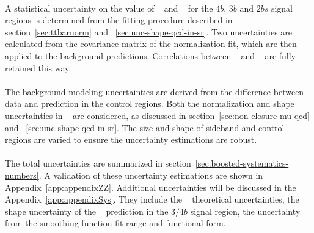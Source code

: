 \paragraph{}
A statistical uncertainty on the value of \muqcd~ and \alphatt~ for the $4b$, $3b$ and $2bs$ signal regions is determined from the fitting procedure described in section~\ref{sec:ttbarnorm} and ~\ref{sec:unc-shape-qcd-in-sr}.
Two uncertainties are calculated from the covariance matrix of the normalization fit, which are then applied to the background predictions.
Correlations between \alphatt~ and \muqcd~ are fully retained this way.

\paragraph{}
The background modeling uncertainties are derived from the difference between data and prediction in the control regions.
Both the normalization and shape uncertainties in \mtwoJ~ are considered, as discussed in section~\ref{sec:non-closure-mu-qcd} and ~\ref{sec:unc-shape-qcd-in-sr}. 
The size and shape of sideband and control regions are varied to ensure the uncertainty estimations are robust.

\paragraph{}
The total uncertainties are summarized in section~\ref{sec:boosted-systematics-numbers}.
A validation of these uncertainty estimations are shown in Appendix~\ref{app:appendixZZ}.
Additional uncertainties will be discussed in the Appendix~\ref{app:appendixSys}. 
They include the \ttbar~ theoretical uncertainties, the shape uncertainty of the \ttbar~ prediction in the $3/4b$ signal region, the uncertainty from the smoothing function fit range and functional form.

